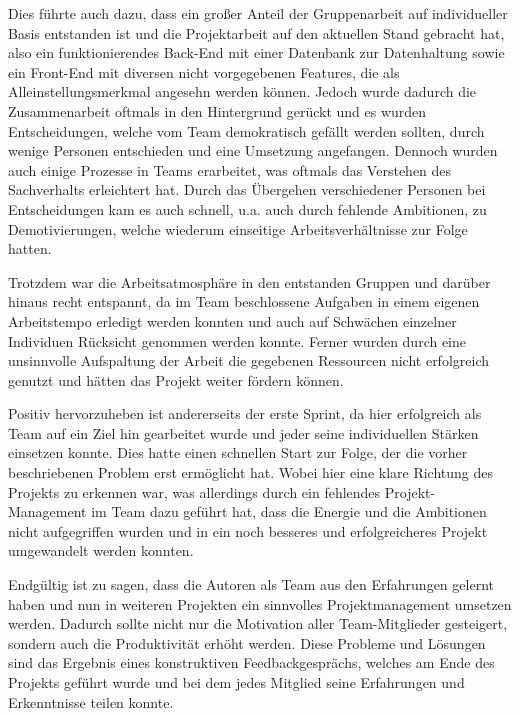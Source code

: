 Dies führte auch dazu, dass ein großer Anteil der Gruppenarbeit auf individueller Basis entstanden ist und die Projektarbeit auf den aktuellen Stand gebracht hat, also ein funktionierendes Back-End mit einer Datenbank zur Datenhaltung sowie ein Front-End mit diversen nicht vorgegebenen Features, die als Alleinstellungsmerkmal angesehn werden können.
Jedoch wurde dadurch die Zusammenarbeit oftmals in den Hintergrund gerückt und es wurden Entscheidungen, welche vom Team demokratisch gefällt werden sollten, durch wenige Personen entschieden und eine Umsetzung angefangen. Dennoch wurden auch einige Prozesse in Teams erarbeitet, was oftmals das Verstehen des Sachverhalts erleichtert hat.
Durch das Übergehen verschiedener Personen bei Entscheidungen kam es auch schnell, u.a. auch durch fehlende Ambitionen, zu Demotivierungen, welche wiederum einseitige Arbeitsverhältnisse zur Folge hatten.

Trotzdem war die Arbeitsatmosphäre in den entstanden Gruppen und darüber hinaus recht entspannt, da im Team beschlossene Aufgaben in einem eigenen Arbeitstempo erledigt werden konnten und auch auf Schwächen einzelner Individuen Rücksicht genommen werden konnte.
Ferner wurden durch eine unsinnvolle Aufspaltung der Arbeit die gegebenen Ressourcen nicht erfolgreich genutzt und hätten das Projekt weiter fördern können.

Positiv hervorzuheben ist andererseits der erste Sprint, da hier erfolgreich als Team auf ein Ziel hin gearbeitet wurde und jeder seine individuellen Stärken einsetzen konnte.
Dies hatte einen schnellen Start zur Folge, der die vorher beschriebenen Problem erst ermöglicht hat.
Wobei hier eine klare Richtung des Projekts zu erkennen war, was allerdings durch ein fehlendes Projekt-Management im Team dazu geführt hat, dass die Energie und die Ambitionen nicht aufgegriffen wurden und in ein noch besseres und erfolgreicheres Projekt umgewandelt werden konnten.

Endgültig ist zu sagen, dass die Autoren als Team aus den Erfahrungen gelernt haben und nun in weiteren Projekten ein sinnvolles Projektmanagement umsetzen werden.
Dadurch sollte nicht nur die Motivation aller Team-Mitglieder gesteigert, sondern auch die Produktivität erhöht werden.
Diese Probleme und Lösungen sind das Ergebnis eines konstruktiven Feedbackgesprächs, welches am Ende des Projekts geführt wurde und bei dem jedes Mitglied seine Erfahrungen und Erkenntnisse teilen konnte.

